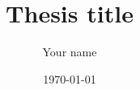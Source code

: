 \documentclass[11pt,twoside]{report}
\title{Thesis title}
\author{Your name}
\date{\today}
\begin{document}
\maketitle

\begin{abstract}
\end{abstract}

\tableofcontents







\end{document}
